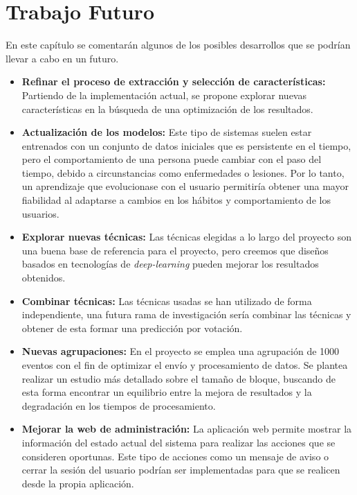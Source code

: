 \chapter{Trabajo Futuro}
\label{sec:future_work}

En este capítulo se comentarán algunos de los posibles desarrollos que se podrían llevar a cabo en un futuro.

\begin{itemize}
    \item \textbf{Refinar el proceso de extracción y selección de características:} Partiendo de la implementación actual, se propone explorar nuevas características en la búsqueda de una optimización de los resultados.
    
    \item \textbf{Actualización de los modelos:} Este tipo de sistemas suelen estar entrenados con un conjunto de datos iniciales que es persistente en el tiempo, pero el comportamiento de una persona puede cambiar con el paso del tiempo, debido a circunstancias como enfermedades o lesiones. Por lo tanto, un aprendizaje que evolucionase con el usuario permitiría obtener una mayor fiabilidad al adaptarse a cambios en los hábitos y comportamiento de los usuarios.    

    \item \textbf{Explorar nuevas técnicas:} Las técnicas elegidas a lo largo del proyecto son una buena base de referencia para el proyecto, pero creemos que diseños basados en tecnologías de \textit{deep-learning} pueden mejorar los resultados obtenidos.
    

    \item \textbf{Combinar técnicas:} Las técnicas usadas se han utilizado de forma independiente, una futura rama de investigación sería combinar las técnicas y obtener de esta formar una predicción por votación.
    
    \item \textbf{Nuevas agrupaciones:} En el proyecto se emplea una agrupación de 1000 eventos con el fin de optimizar el envío y procesamiento de datos. Se plantea realizar un estudio más detallado sobre el tamaño de bloque, buscando de esta forma encontrar un equilibrio entre la mejora de resultados y la degradación en los tiempos de procesamiento.
    
    \item \textbf{Mejorar la web de administración:} La aplicación web permite mostrar la información del estado actual del sistema para realizar las acciones que se consideren oportunas. Este tipo de acciones como un mensaje de aviso o cerrar la sesión del usuario podrían ser implementadas para que se realicen desde la propia aplicación.
\end{itemize}
